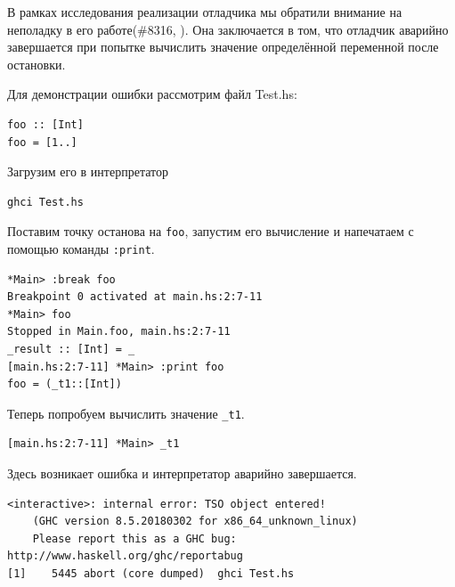\documentclass[fontsize=14pt, paper=a4, pagesize, DIV=calc]{scrartcl}
\def\code#1{\texttt{#1}}
\begin{document}
В рамках исследования реализации отладчика мы обратили внимание на неполадку в
его работе(\#{}8316, \cite{bug}). Она заключается в том, что отладчик аварийно
завершается при попытке вычислить значение определённой переменной после
остановки.

Для демонстрации ошибки рассмотрим файл Test.hs:

\begin{ListingEnv}
\caption{Test.hs}
\begin{lstlisting}
foo :: [Int]
foo = [1..]
\end{lstlisting}
\end{ListingEnv}

Загрузим его в интерпретатор

\begin{ListingEnv}
\caption{}
\begin{lstlisting}[numbers=none]
ghci Test.hs
\end{lstlisting}
\end{ListingEnv}

Поставим точку останова на \code{foo}, запустим его вычисление и
напечатаем с помощью команды \code{:print}.

\begin{ListingEnv}
\caption{}
\begin{lstlisting}[numbers=none]
*Main> :break foo
Breakpoint 0 activated at main.hs:2:7-11
*Main> foo
Stopped in Main.foo, main.hs:2:7-11
_result :: [Int] = _
[main.hs:2:7-11] *Main> :print foo
foo = (_t1::[Int])
\end{lstlisting}
\end{ListingEnv}

Теперь попробуем вычислить значение \code{\_t1}.

\begin{ListingEnv}
\caption{}
\begin{lstlisting}[numbers=none]
[main.hs:2:7-11] *Main> _t1
\end{lstlisting}
\end{ListingEnv}

Здесь возникает ошибка и интерпретатор аварийно завершается.

\begin{ListingEnv}
\caption{Ошибка}
\begin{lstlisting}[numbers=none]
<interactive>: internal error: TSO object entered!
    (GHC version 8.5.20180302 for x86_64_unknown_linux)
    Please report this as a GHC bug:  http://www.haskell.org/ghc/reportabug
[1]    5445 abort (core dumped)  ghci Test.hs
\end{lstlisting}
\end{ListingEnv}
\end{document}

